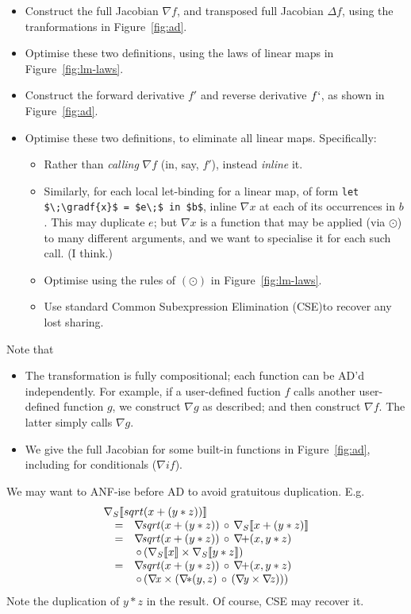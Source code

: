 \documentclass[sigplan,review]{acmart}
\newcommand{\grad}[1]{\nabla_S\lb #1 \rb}  %
\newcommand{\gradf}[1]{\nabla\! \mathit{#1}}  %
\newcommand{\gradft}[1]{\Delta\mathit{#1}}  %
\newcommand{\fwdDf}[1]{f'}  %
\newcommand{\revDf}[1]{f`}  %
\newcommand{\lb}{\llbracket}
\newcommand{\rb}{\rrbracket}
\newcommand{\iffun}{\mathit{if}}
\newcommand{\lmapply}{\odot}   %
\newcommand{\lmcomp}{\,\circ\,}   %
\newcommand{\lmpair}{\times}         %
\begin{document}
\begin{itemize}
\item Construct the full Jacobian $\gradf{f}$, and transposed full Jacobian $\gradft{f}$,
  using the tranformations in Figure~\ref{fig:ad}.
\item Optimise these two definitions, using the laws of linear maps
  in Figure~\ref{fig:lm-laws}.
\item Construct the forward derivative $\fwdDf{f}$ and reverse derivative $\revDf{f}$,
  as shown in Figure~\ref{fig:ad}.
\item Optimise these two definitions, to eliminate all linear maps. Specifically:
  \begin{itemize}
    \item Rather than \emph{calling} $\gradf{f}$ (in, say, $\fwdDf{f}$), instead \emph{inline} it.
    \item Similarly, for each local let-binding for a linear map, of form \lstinline|let $\;\gradf{x}$ = $e\;$ in $b$|,
      inline $\gradf{x}$ at each of its occurrences in $b$. This may duplicate $e$; but $\gradf{x}$ is a function
      that may be applied (via $\lmapply$) to many different arguments, and we want to specialise it for each
      such call.  (I think.)
    \item Optimise using the rules of $(\lmapply)$ in Figure~\ref{fig:lm-laws}.
    \item Use standard Common Subexpression Elimination (CSE)to recover any lost sharing.
  \end{itemize}
\end{itemize}

Note that
\begin{itemize}
\item The transformation is fully compositional; each function can be AD'd independently.
  For example, if a user-defined
  fuction $f$ calls another user-defined function $g$, we construct $\gradf{g}$ as
  described; and then construct $\gradf{f}$. The latter simply calls $\gradf{g}$.
  
\item We give the full Jacobian for some built-in functions in Figure~\ref{fig:ad}, including
  for conditionals ($\gradf{\iffun}$).
\end{itemize}

We may want to ANF-ise before AD to avoid gratuitous duplication.
  E.g.
$$
  \begin{array}{rcl}
    \multicolumn{3}{l}{\grad{sqrt(x+(y*z))}} \\
      & = & \gradf{sqrt}(x+(y*z)) \lmcomp \grad{x+(y*z)} \\
    & = & \gradf{sqrt}(x+(y*z)) \lmcomp  \gradf{+}(x, y*z) \\
     && \lmcomp (\grad{x} \lmpair \grad{y*z}) \\
    & = & \gradf{sqrt}(x+(y*z)) \lmcomp \gradf{+}(x, y*z) \\
    & & \lmcomp (\gradf{x} \lmpair (\gradf{*}(y,z) \lmcomp (\gradf{y} \lmpair \gradf{z}))) \\
  \end{array}
  $$
Note the duplication of $y*z$ in the result.
Of course, CSE may recover it.
\end{document}
